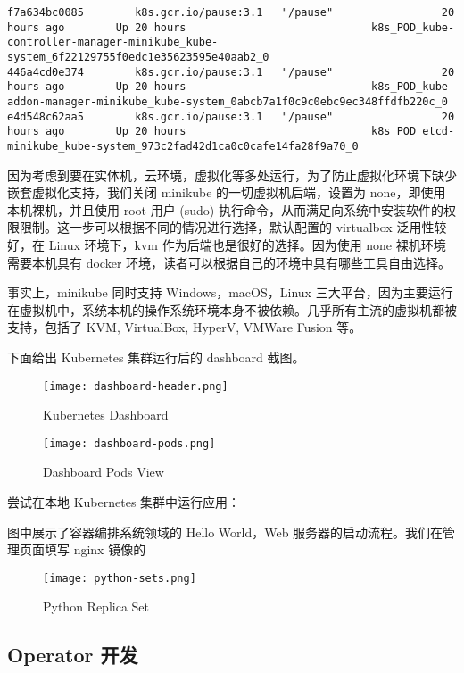 \begin{lstlisting}
f7a634bc0085        k8s.gcr.io/pause:3.1   "/pause"                 20 hours ago        Up 20 hours                             k8s_POD_kube-controller-manager-minikube_kube-system_6f22129755f0edc1e35623595e40aab2_0
446a4cd0e374        k8s.gcr.io/pause:3.1   "/pause"                 20 hours ago        Up 20 hours                             k8s_POD_kube-addon-manager-minikube_kube-system_0abcb7a1f0c9c0ebc9ec348ffdfb220c_0
e4d548c62aa5        k8s.gcr.io/pause:3.1   "/pause"                 20 hours ago        Up 20 hours                             k8s_POD_etcd-minikube_kube-system_973c2fad42d1ca0c0cafe14fa28f9a70_0
\end{lstlisting}

因为考虑到要在实体机，云环境，虚拟化等多处运行，为了防止虚拟化环境下缺少嵌套虚拟化支持，我们关闭 minikube 的一切虚拟机后端，设置为 none，即使用本机裸机，并且使用 root 用户 (sudo) 执行命令，从而满足向系统中安装软件的权限限制。这一步可以根据不同的情况进行选择，默认配置的 virtualbox 泛用性较好，在 Linux 环境下，kvm 作为后端也是很好的选择。因为使用 none 裸机环境需要本机具有 docker 环境，读者可以根据自己的环境中具有哪些工具自由选择。

事实上，minikube 同时支持 Windows，macOS，Linux 三大平台，因为主要运行在虚拟机中，系统本机的操作系统环境本身不被依赖。几乎所有主流的虚拟机都被支持，包括了 KVM, VirtualBox, HyperV, VMWare Fusion 等。

下面给出 Kubernetes 集群运行后的 dashboard 截图。

\begin{figure}
    \texttt{[image: dashboard-header.png]}
    \caption{Kubernetes Dashboard}
\end{figure}

\begin{figure}
    \texttt{[image: dashboard-pods.png]}
    \caption{Dashboard Pods View}
\end{figure}

尝试在本地 Kubernetes 集群中运行应用：

图中展示了容器编排系统领域的 Hello World，Web 服务器的启动流程。我们在管理页面填写 nginx 镜像的

\begin{figure}
    \texttt{[image: python-sets.png]}
    \caption{Python Replica Set}
\end{figure}


\subsection{Operator 开发}

